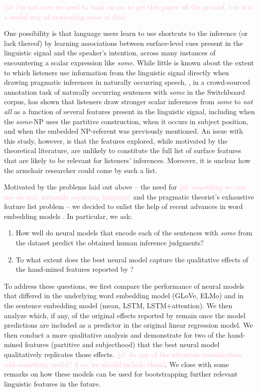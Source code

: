 \documentclass[11pt,a4paper]{article}
\newcommand{\jd}[1]{\textcolor{Pink}{[jd: #1]}}
\begin{document}
\jd{i'm not sure we need to bash on rsa to get this paper off the ground, but it is a useful way of motivating some of this}

One possibility is that language users learn to use shortcuts to the inference (or lack thereof) by learning associations between surface-level cues present in the linguistic signal and the speaker's intention, across many instances of encountering a scalar expression like \emph{some}.  While little is known about the extent to which listeners use information from the linguistic signal directly when drawing pragmatic inferences in naturally occurring speech, \citet{degen2015investigating}, in a crowd-sourced annotation task of naturally occurring sentences with \emph{some} in the Switchboard corpus, has shown that listeners draw stronger scalar inferences from \emph{some} to \emph{not all} as a function of several features present in the linguistic signal, including when the \emph{some}-NP uses the partitive construction, when it occurs in subject position, and when the embedded NP-referent was previously mentioned. An issue with this study, however, is that the features explored, while motivated by the theoretical literature, are unlikely to constitute the full list of surface features that are likely to be relevant for listeners' inferences. Moreover, it is unclear how the armchair researcher could come by such a list.

Motivated by the problems laid out above -- the need for \jd{something we can use on real, naturally occurring language} and the pragmatic theorist's exhaustive feature list problem -- we decided to enlist the help of recent advances in word embedding models \cite{pennington2014glove, peters2018deep, devlin2018bert}. In particular, we ask: 

\begin{enumerate}
	\item How well do neural models that encode each of the sentences with \emph{some} from the \citet{degen2015investigating} dataset predict the obtained human inference judgments? 
	\item To what extent does the best neural model capture the qualitative effects of the hand-mined features reported by \citet{degen2015investigating}?
\end{enumerate}

To address these questions, we first compare the performance of neural models that differed in the underlying word embedding model (GLoVe, ELMo) and in the sentence embedding model (mean, LSTM, LSTM$+$attention). We then analyze which, if any, of the original effects reported by \citet{degen2015investigating} remain once the model predictions are included as a predictor in the original linear regression model. We then conduct a more qualitative analysis and demonstrate for two of the hand-mined features (partitive and subjecthood) that the best neural model qualitatively replicates those effects. \jd{do any of the attention visualizations add something useful? if so, we should include them}. We close with some remarks on how these models can be used for bootstrapping further relevant linguistic features in the future.
\end{document}
